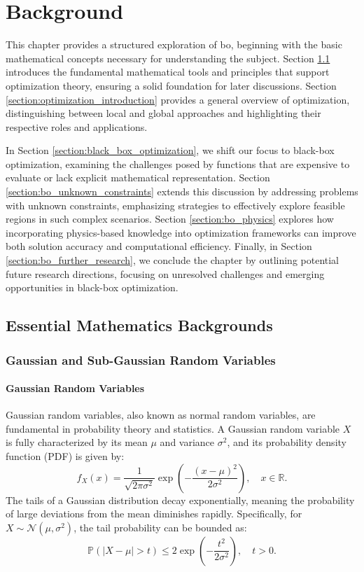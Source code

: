 \chapter{Background} %

\label{chap:background} 

This chapter provides a structured exploration of \acl{bo}, beginning with the basic mathematical concepts necessary for understanding the subject. Section \ref{section:math_backgrounds} introduces the fundamental mathematical tools and principles that support optimization theory, ensuring a solid foundation for later discussions. Section \ref{section:optimization_introduction} provides a general overview of optimization, distinguishing between local and global approaches and highlighting their respective roles and applications.

In Section \ref{section:black_box_optimization}, we shift our focus to black-box optimization, examining the challenges posed by functions that are expensive to evaluate or lack explicit mathematical representation. Section \ref{section:bo_unknown_constraints} extends this discussion by addressing problems with unknown constraints, emphasizing strategies to effectively explore feasible regions in such complex scenarios. Section \ref{section:bo_physics} explores how incorporating physics-based knowledge into optimization frameworks can improve both solution accuracy and computational efficiency. Finally, in Section \ref{section:bo_further_research}, we conclude the chapter by outlining potential future research directions, focusing on unresolved challenges and emerging opportunities in black-box optimization.

\section{Essential Mathematics Backgrounds}
\label{section:math_backgrounds}
\subsection{Gaussian and Sub-Gaussian Random Variables}
\subsubsection{Gaussian Random Variables}  
Gaussian random variables, also known as normal random variables, are fundamental in probability theory and statistics. A Gaussian random variable \( X \) is fully characterized by its mean \( \mu \) and variance \( \sigma^2 \), and its probability density function (PDF) is given by:  
\[
f_X(x) = \frac{1}{\sqrt{2\pi \sigma^2}} \exp\left(-\frac{(x - \mu)^2}{2\sigma^2}\right), \quad x \in \mathbb{R}.
\]  
The tails of a Gaussian distribution decay exponentially, meaning the probability of large deviations from the mean diminishes rapidly. Specifically, for \( X \sim \mathcal{N}(\mu, \sigma^2) \), the tail probability can be bounded as:  
\[
\mathbb{P}(\vert X - \mu \vert > t) \leq 2 \exp\left(-\frac{t^2}{2\sigma^2}\right), \quad t > 0.
\]  

